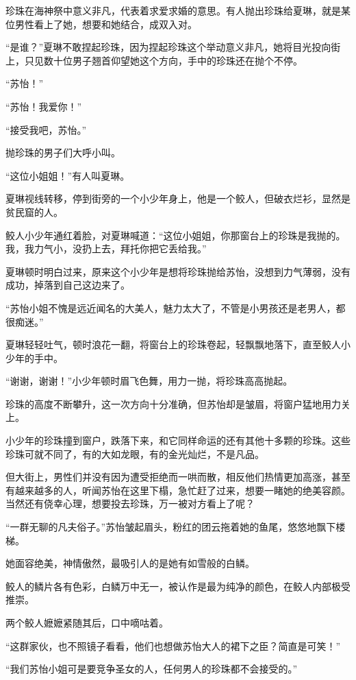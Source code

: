 \begin{this_body}
珍珠在海神祭中意义非凡，代表着求爱求婚的意思。有人抛出珍珠给夏琳，就是某位男性看上了她，想要和她结合，成双入对。

“是谁？”夏琳不敢捏起珍珠，因为捏起珍珠这个举动意义非凡，她将目光投向街上，只见数十位男子翘首仰望她这个方向，手中的珍珠还在抛个不停。

“苏怡！”

“苏怡！我爱你！”

“接受我吧，苏怡。”

抛珍珠的男子们大呼小叫。

“这位小姐姐！”有人叫夏琳。

夏琳视线转移，停到街旁的一个小少年身上，他是一个鲛人，但破衣烂衫，显然是贫民窟的人。

鲛人小少年通红着脸，对夏琳喊道：“这位小姐姐，你那窗台上的珍珠是我抛的。我，我力气小，没扔上去，拜托你把它丢给我。”

夏琳顿时明白过来，原来这个小少年是想将珍珠抛给苏怡，没想到力气薄弱，没有成功，掉落到自己这边来了。

“苏怡小姐不愧是远近闻名的大美人，魅力太大了，不管是小男孩还是老男人，都很痴迷。”

夏琳轻轻吐气，顿时浪花一翻，将窗台上的珍珠卷起，轻飘飘地落下，直至鲛人小少年的手中。

“谢谢，谢谢！”小少年顿时眉飞色舞，用力一抛，将珍珠高高抛起。

珍珠的高度不断攀升，这一次方向十分准确，但苏怡却是皱眉，将窗户猛地用力关上。

小少年的珍珠撞到窗户，跌落下来，和它同样命运的还有其他十多颗的珍珠。这些珍珠可就不同了，有的大如龙眼，有的金光灿烂，不是凡品。

但大街上，男性们并没有因为遭受拒绝而一哄而散，相反他们热情更加高涨，甚至有越来越多的人，听闻苏怡在这里下榻，急忙赶了过来，想要一睹她的绝美容颜。当然还有侥幸心理，想要投去珍珠，万一被对方看上了呢？

“一群无聊的凡夫俗子。”苏怡皱起眉头，粉红的团云拖着她的鱼尾，悠悠地飘下楼梯。

她面容绝美，神情傲然，最吸引人的是她有如雪般的白鳞。

鲛人的鳞片各有色彩，白鳞万中无一，被认作是最为纯净的颜色，在鲛人内部极受推崇。

两个鲛人嬷嬷紧随其后，口中嘀咕着。

“这群家伙，也不照镜子看看，他们也想做苏怡大人的裙下之臣？简直是可笑！”

“我们苏怡小姐可是要竞争圣女的人，任何男人的珍珠都不会接受的。”


\end{this_body}

